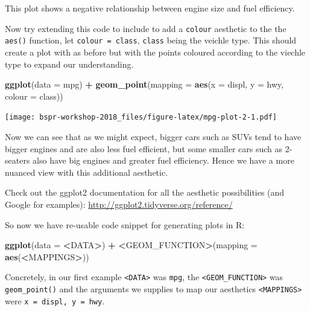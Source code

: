 \documentclass[12pt,]{book}
\newenvironment{Shaded}{\begin{snugshade}}{\end{snugshade}}
\newcommand{\KeywordTok}[1]{\textcolor[rgb]{0.13,0.29,0.53}{\textbf{#1}}}
\newcommand{\DataTypeTok}[1]{\textcolor[rgb]{0.13,0.29,0.53}{#1}}
\newcommand{\StringTok}[1]{\textcolor[rgb]{0.31,0.60,0.02}{#1}}
\newcommand{\OperatorTok}[1]{\textcolor[rgb]{0.81,0.36,0.00}{\textbf{#1}}}
\newcommand{\ErrorTok}[1]{\textcolor[rgb]{0.64,0.00,0.00}{\textbf{#1}}}
\newcommand{\NormalTok}[1]{#1}
\theoremstyle{definition}
\theoremstyle{definition}
\theoremstyle{definition}
\theoremstyle{remark}
\begin{document}
This plot shows a negative relationship between engine size and fuel
efficiency.

Now try extending this code to include to add a \texttt{colour}
aesthetic to the the \texttt{aes()} function, let
\texttt{colour\ =\ class}, \texttt{class} being the veichle type. This
should create a plot with as before but with the points coloured
according to the viechle type to expand our understanding.

\begin{Shaded}
\begin{Highlighting}[]
\KeywordTok{ggplot}\NormalTok{(}\DataTypeTok{data =}\NormalTok{ mpg) }\OperatorTok{+}\StringTok{ }
\StringTok{  }\KeywordTok{geom_point}\NormalTok{(}\DataTypeTok{mapping =} \KeywordTok{aes}\NormalTok{(}\DataTypeTok{x =}\NormalTok{ displ, }\DataTypeTok{y =}\NormalTok{ hwy, }\DataTypeTok{colour =}\NormalTok{ class))}
\end{Highlighting}
\end{Shaded}

\texttt{[image: bspr-workshop-2018\_files/figure-latex/mpg-plot-2-1.pdf]}

Now we can see that as we might expect, bigger cars such as SUVs tend to
have bigger engines and are also less fuel efficient, but some smaller
cars such as 2-seaters also have big engines and greater fuel
efficiency. Hence we have a more nuanced view with this additional
aesthetic.

Check out the ggplot2 documentation for all the aesthetic possibilities
(and Google for examples): \url{http://ggplot2.tidyverse.org/reference/}

So now we have re-usable code snippet for generating plots in R:

\begin{Shaded}
\begin{Highlighting}[]
\KeywordTok{ggplot}\NormalTok{(}\DataTypeTok{data =} \OperatorTok{<}\NormalTok{DATA}\OperatorTok{>}\NormalTok{) }\OperatorTok{+}\StringTok{ }
\StringTok{  }\ErrorTok{<}\NormalTok{GEOM_FUNCTION}\OperatorTok{>}\NormalTok{(}\DataTypeTok{mapping =} \KeywordTok{aes}\NormalTok{(}\OperatorTok{<}\NormalTok{MAPPINGS}\OperatorTok{>}\NormalTok{))}
\end{Highlighting}
\end{Shaded}

Concretely, in our first example \texttt{\textless{}DATA\textgreater{}}
was \texttt{mpg}, the \texttt{\textless{}GEOM\_FUNCTION\textgreater{}}
was \texttt{geom\_point()} and the arguments we supplies to map our
aesthetics \texttt{\textless{}MAPPINGS\textgreater{}} were
\texttt{x\ =\ displ,\ y\ =\ hwy}.
\end{document}
